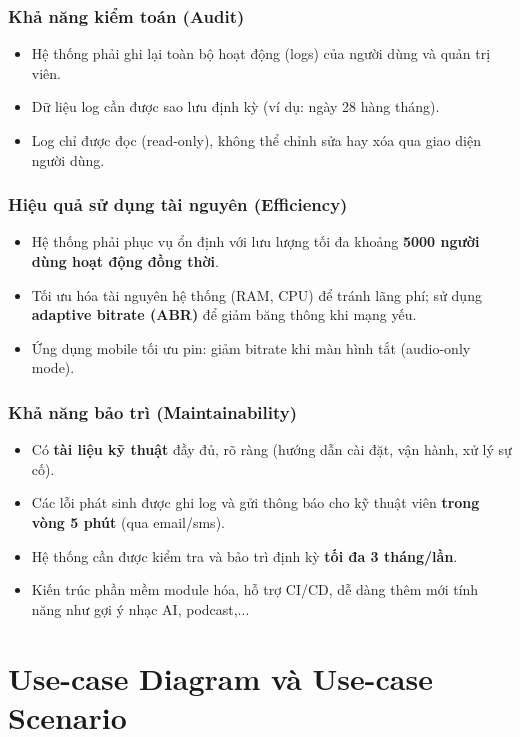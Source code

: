\documentclass[a4paper]{article}
\begin{document}
\subsubsection{Khả năng kiểm toán (Audit)}
\begin{itemize}
	\item Hệ thống phải ghi lại toàn bộ hoạt động (logs) của người dùng và quản trị viên.
	\item Dữ liệu log cần được sao lưu định kỳ (ví dụ: ngày 28 hàng tháng).
	\item Log chỉ được đọc (read-only), không thể chỉnh sửa hay xóa qua giao diện người dùng.
\end{itemize}

\subsubsection{Hiệu quả sử dụng tài nguyên (Efficiency)}
\begin{itemize}
	\item Hệ thống phải phục vụ ổn định với lưu lượng tối đa khoảng \textbf{5000 người dùng hoạt động đồng thời}.
	\item Tối ưu hóa tài nguyên hệ thống (RAM, CPU) để tránh lãng phí; sử dụng \textbf{adaptive bitrate (ABR)} để giảm băng thông khi mạng yếu.
	\item Ứng dụng mobile tối ưu pin: giảm bitrate khi màn hình tắt (audio-only mode).
\end{itemize}

\subsubsection{Khả năng bảo trì (Maintainability)}
\begin{itemize}
	\item Có \textbf{tài liệu kỹ thuật} đầy đủ, rõ ràng (hướng dẫn cài đặt, vận hành, xử lý sự cố).
	\item Các lỗi phát sinh được ghi log và gửi thông báo cho kỹ thuật viên \textbf{trong vòng 5 phút} (qua email/sms).
	\item Hệ thống cần được kiểm tra và bảo trì định kỳ \textbf{tối đa 3 tháng/lần}.
	\item Kiến trúc phần mềm module hóa, hỗ trợ CI/CD, dễ dàng thêm mới tính năng như gợi ý nhạc AI, podcast,...
\end{itemize}

\section{Use-case Diagram và Use-case Scenario}
\end{document}
